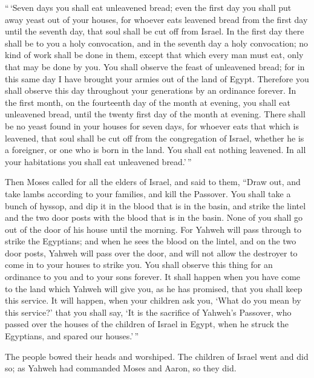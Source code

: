  ``\,`Seven days you shall eat unleavened bread; even the
first day you shall put away yeast out of your houses, for whoever eats
leavened bread from the first day until the seventh day, that soul shall
be cut off from Israel.  In the first day there shall be
to you a holy convocation, and in the seventh day a holy convocation; no
kind of work shall be done in them, except that which every man must
eat, only that may be done by you.  You shall observe the
feast of unleavened bread; for in this same day I have brought your
armies out of the land of Egypt. Therefore you shall observe this day
throughout your generations by an ordinance forever.  In
the first month, on the fourteenth day of the month at evening, you
shall eat unleavened bread, until the twenty first day of the month at
evening.  There shall be no yeast found in your houses
for seven days, for whoever eats that which is leavened, that soul shall
be cut off from the congregation of Israel, whether he is a foreigner,
or one who is born in the land.  You shall eat nothing
leavened. In all your habitations you shall eat unleavened bread.'\,''

 Then Moses called for all the elders of Israel, and said
to them, ``Draw out, and take lambs according to your families, and kill
the Passover.  You shall take a bunch of hyssop, and dip
it in the blood that is in the basin, and strike the lintel and the two
door posts with the blood that is in the basin. None of you shall go out
of the door of his house until the morning.  For Yahweh
will pass through to strike the Egyptians; and when he sees the blood on
the lintel, and on the two door posts, Yahweh will pass over the door,
and will not allow the destroyer to come in to your houses to strike
you.  You shall observe this thing for an ordinance to
you and to your sons forever.  It shall happen when you
have come to the land which Yahweh will give you, as he has promised,
that you shall keep this service.  It will happen, when
your children ask you, `What do you mean by this service?'
 that you shall say, `It is the sacrifice of Yahweh's
Passover, who passed over the houses of the children of Israel in Egypt,
when he struck the Egyptians, and spared our houses.'\,''

The people bowed their heads and worshiped.  The children
of Israel went and did so; as Yahweh had commanded Moses and Aaron, so
they did.

